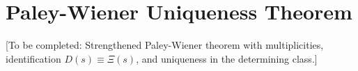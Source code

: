 \section{Paley-Wiener Uniqueness Theorem}

[To be completed: Strengthened Paley-Wiener theorem with multiplicities, identification $D(s) \equiv \Xi(s)$, and uniqueness in the determining class.]
